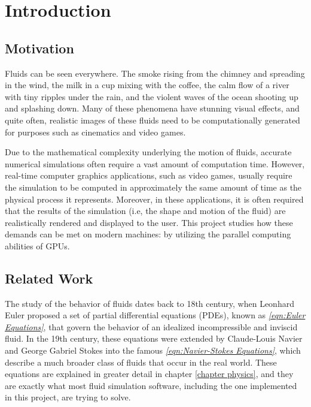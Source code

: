 \chapter{Introduction}

\section{Motivation}
Fluids can be seen everywhere. The smoke rising from the chimney and spreading in the wind, the milk in a cup mixing with the coffee, the calm flow of a river with tiny ripples under the rain, and the violent waves of the ocean shooting up and splashing down. Many of these phenomena have stunning visual effects, and quite often, realistic images of these fluids need to be computationally generated for purposes such as cinematics and video games. 


Due to the mathematical complexity underlying the motion of fluids, accurate numerical simulations often require a vast amount of computation time. However, real-time computer graphics applications, such as video games, usually require the simulation to be computed in approximately the same amount of time as the physical process it represents. Moreover, in these applications, it is often required that the results of the simulation (i.e, the shape and motion of the fluid) are realistically rendered and displayed to the user. This project studies how these demands can be met on modern machines: by utilizing the parallel computing abilities of GPUs.




\section{Related Work}



The study of the behavior of fluids dates back to 18th century, when Leonhard Euler proposed a set of partial differential equations (PDEs), known as \textit{\ref{eqn:Euler Equations}}, that govern the behavior of an idealized incompressible and inviscid fluid. In the 19th century, these equations were extended by Claude-Louis Navier and George Gabriel Stokes into the famous \textit{\ref{eqn:Navier-Stokes Equations}}, which describe a much broader class of fluids that occur in the real world. These equations are explained in greater detail in chapter \ref{chapter physics}, and they are exactly what most fluid simulation software, including the one implemented in this project, are trying to solve. 

